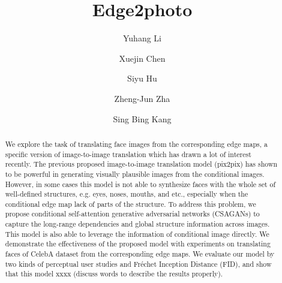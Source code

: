 \documentclass[format=acmsmall, review=false, screen=true]{acmart}
\begin{document}
\title[Edge2photo]{Edge2photo}

\author{Yuhang Li}
%
%
\author{Xuejin Chen}
%
%
\author{Siyu Hu}
%
%
\author{Zheng-Jun Zha}
%
%
\author{Sing Bing Kang}

\begin{abstract}
We explore the task of translating face images from the corresponding edge maps, a specific version of image-to-image translation which has drawn a lot of interest recently. 
The previous proposed image-to-image translation model (pix2pix) has shown to be powerful in generating visually plausible images from the conditional images.
However, in some cases this model is not able to synthesize faces with the whole set of well-defined structures, e.g. eyes, noses, mouths, and etc., especially when the conditional edge map lack of parts of the structure. 
To address this problem, we propose conditional self-attention generative adversarial networks (CSAGANs) to capture the long-range dependencies and global structure information across images. This model is also able to leverage the information of conditional image directly. We demonstrate the effectiveness of the proposed model with experiments on translating faces of CelebA dataset from the corresponding edge maps. We evaluate our model by two kinds of perceptual user studies and Fr\'echet Inception Distance (FID), and show that this model xxxx (discuss words to describe the results properly).
\end{abstract}
\end{document}
